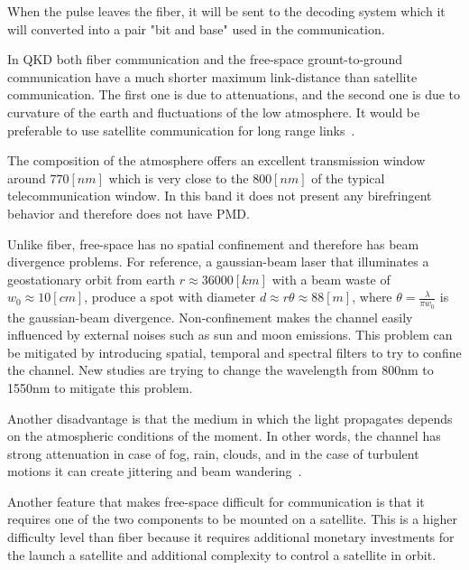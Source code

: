 When the pulse leaves the fiber, it will be sent to the decoding system which it will converted into a pair "bit and base" used in the communication.


In QKD both fiber communication and the free-space grount-to-ground communication have a much shorter maximum link-distance than satellite communication. The first one is due to attenuations, and the second one is due to curvature of the earth and fluctuations of the low atmosphere. It would be preferable to use satellite communication for long range links~\cite{a14}.

The composition of the atmosphere offers an excellent transmission window around $770 [nm]$ which is very close to the $800 [nm]$ of the typical telecommunication window. In this band it does not present any birefringent behavior and therefore does not have PMD.

Unlike fiber, free-space has no spatial confinement and therefore has beam divergence problems. For reference, a gaussian-beam laser that illuminates a geostationary orbit from earth $r \approx 36000[km]$ with a beam waste of $w_0 \approx 10 [cm]$, produce a spot with diameter $d \approx r \theta \approx 88 [m]$, where $\theta = \frac{\lambda}{\pi w_0}$ is the gaussian-beam divergence. Non-confinement makes the channel easily influenced by external noises such as sun and moon emissions. This problem can be mitigated by introducing spatial, temporal and spectral filters to try to confine the channel. New studies are trying to change the wavelength from 800nm to 1550nm to mitigate this problem.

Another disadvantage is that the medium in which the light propagates depends on the atmospheric conditions of the moment. In other words, the channel has strong attenuation in case of fog, rain, clouds, and in the case of turbulent motions it can create jittering and beam wandering~\cite{a25}.

Another feature that makes free-space difficult for communication is that it requires one of the two components to be mounted on a satellite. This is a higher difficulty level than fiber because it requires additional monetary investments for the launch a satellite and additional complexity to control a satellite in orbit.